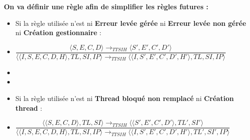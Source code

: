 \documentclass[10pt,a4paper]{report}
\begin{document}
	
	\textbf{On va définir une règle afin de simplifier les règles futures :} 
	\begin{itemize}
		\item[]  Si la règle utilisée n'est ni \textbf{Erreur levée gérée} ni \textbf{Erreur levée non gérée} ni \textbf{Création gestionnaire} :
		\item[] \begin{center}
			$\dfrac{\langle S,E,C,D\rangle \longrightarrow_{TTSIH} \langle S',E',C',D'\rangle}{\langle\langle I,S,E,C,D,H\rangle,TL,SI,IP\rangle \longrightarrow_{TTSIH} \langle\langle I,S',E',C',D',H'\rangle,TL,SI,IP\rangle}$
		\end{center}
		\item[]
		\item[]
		\item[] Si la règle utilisée n'est ni \textbf{Thread bloqué non remplacé} ni \textbf{Création thread} :
		\smallbreak 
		\item[] \begin{center}
			$\dfrac{\langle\langle S,E,C,D\rangle,TL,SI\rangle \longrightarrow_{TTSIH} \langle\langle S',E',C',D'\rangle,TL',SI'\rangle}{\langle\langle I,S,E,C,D,H\rangle,TL,SI,IP\rangle \longrightarrow_{TTSIH} \langle\langle I,S',E',C',D',H'\rangle,TL',SI',IP\rangle}$ 
		\end{center}
	\end{itemize}
	\newpage
	
\end{document}
